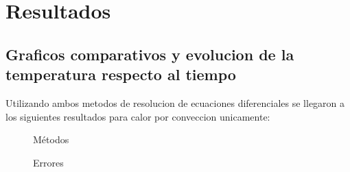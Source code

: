 \documentclass[11pt,a4paper]{article}
\begin{document}
\section{Resultados}

\subsection{Graficos comparativos y evolucion de la temperatura respecto al tiempo}

Utilizando ambos metodos de resolucion de ecuaciones diferenciales se llegaron a los siguientes resultados para calor por conveccion unicamente:

\begin{figure}[H]
	\caption{Métodos}
	\label{fig:metodos}
\end{figure}

\begin{figure}[H]
	\caption{Errores}
	\label{fig:errores}
\end{figure}
\end{document}
